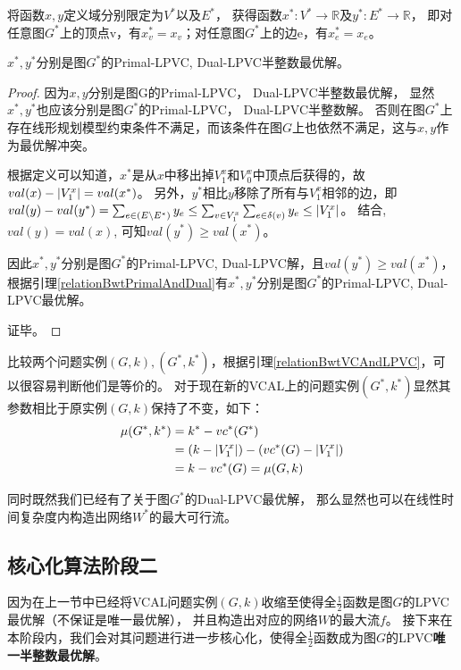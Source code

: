 将函数$x,y$定义域分别限定为$V^*$以及$E^*$，
获得函数$x^*:V^* \rightarrow \mathbb{R}$及$y^*:E^* \rightarrow \mathbb{R}$，
即对任意图$G^*$上的顶点v，有$x^*_v=x_v$；对任意图$G^*$上的边e，有$x^*_e=x_e$。
\begin{claim}
$x^*, y^*$分别是图$G^*$的Primal-LPVC, Dual-LPVC半整数最优解。
\end{claim}
\begin{proof}
因为$x, y$分别是图G的Primal-LPVC， Dual-LPVC半整数最优解，
显然$x^*, y^*$也应该分别是图$G^*$的Primal-LPVC， Dual-LPVC半整数解。
否则在图$G^*$上存在线形规划模型约束条件不满足，而该条件在图$G$上也依然不满足，这与$x,y$作为最优解冲突。

根据定义可以知道，$x^*$是从$x$中移出掉$V^x_1$和$V^x_0$中顶点后获得的，故$val(x) - \left\vert V^x_1 \right\vert = val(x^*)$。
另外，$y^*$相比$y$移除了所有与$V^x_1$相邻的边，即$val(y) - val(y^*) = \sum_{e \in (E \setminus E^*)}{y_e}
\le \sum_{v \in V^x_1}{\sum_{e \in \delta(v)}{y_e}}\le\left\vert V^x_1 \right\vert$。
结合, $val(y) = val(x)$, 可知$val(y^*) \ge val(x^*)$。

因此$x^*, y^*$分别是图$G^*$的Primal-LPVC, Dual-LPVC解，且$val(y^*) \ge val(x^*)$，
根据引理\ref{relationBwtPrimalAndDual}有$x^*, y^*$分别是图$G^*$的Primal-LPVC, Dual-LPVC最优解。

证毕。
\end{proof}

比较两个问题实例$(G, k), (G^*, k^*)$，根据引理\ref{relationBwtVCAndLPVC}，可以很容易判断他们是等价的。
对于现在新的VCAL上的问题实例$(G^*, k^*)$显然其参数相比于原实例$(G, k)$保持了不变，如下：
\begin{equation*} \begin{aligned}
  \mu(G^*, k^*) &= k^* - vc^*(G^*) \\
                &= (k - \left\vert V^x_1 \right\vert) - (vc^*(G) - \left\vert V^x_1 \right\vert) \\
                &= k - vc^*(G) = \mu(G, k)
\end{aligned} \end{equation*}

同时既然我们已经有了关于图$G^*$的Dual-LPVC最优解，
那么显然也可以在线性时间复杂度内构造出网络$W^*$的最大可行流。

\subsection{核心化算法阶段二}
因为在上一节中已经将VCAL问题实例$(G, k)$收缩至使得全$\frac{1}{2}$函数是图$G$的LPVC最优解（不保证是唯一最优解），
并且构造出对应的网络$W$的最大流$f$。
接下来在本阶段内，我们会对其问题进行进一步核心化，使得全$\frac{1}{2}$函数成为图$G$的LPVC\textbf{唯一半整数最优解}。

